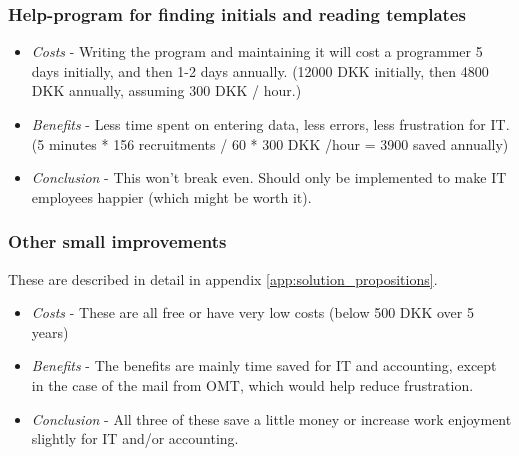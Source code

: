 \subsubsection{Help-program for finding initials and reading templates}
\begin{itemize}
	\item \emph{Costs} - Writing the program and maintaining it will cost a programmer 5 days initially, and then 1-2 days annually. (12000 DKK initially, then 4800 DKK annually, assuming 300 DKK / hour.)
	\item \emph{Benefits} - Less time spent on entering data, less errors, less frustration for IT. (5 minutes * 156 recruitments / 60 * 300 DKK /hour = 3900 saved annually)
	\item \emph{Conclusion} - This won't break even. Should only be implemented to make IT employees happier (which might be worth it).
\end{itemize}

\subsubsection{Other small improvements}
These are described in detail in appendix \ref{app:solution_propositions}.
\begin{itemize}
	\item \emph{Costs} - These are all free or have very low costs (below 500 DKK over 5 years)
	\item \emph{Benefits} - The benefits are mainly time saved for IT and accounting, except in the case of the mail from OMT, which would help reduce frustration.
	\item \emph{Conclusion} - All three of these save a little money or increase work enjoyment slightly for IT and/or accounting.
\end{itemize}